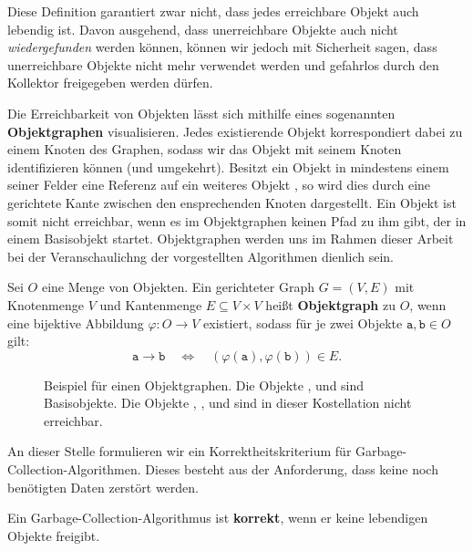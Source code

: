 Diese Definition garantiert zwar nicht, dass jedes erreichbare Objekt auch lebendig ist.
Davon ausgehend, dass unerreichbare Objekte auch nicht \textit{wiedergefunden} werden können, können wir jedoch mit Sicherheit sagen, dass unerreichbare Objekte nicht mehr verwendet werden und gefahrlos durch den Kollektor freigegeben werden dürfen.

Die Erreichbarkeit von Objekten lässt sich mithilfe eines sogenannten \textbf{Objektgraphen} visualisieren.
Jedes existierende Objekt korrespondiert dabei zu einem Knoten des Graphen, sodass wir das Objekt mit seinem Knoten identifizieren können (und umgekehrt).
Besitzt ein Objekt  in mindestens einem seiner Felder eine Referenz auf ein weiteres Objekt , so wird dies durch eine gerichtete Kante zwischen den ensprechenden Knoten dargestellt.
Ein Objekt ist somit nicht erreichbar, wenn es im Objektgraphen keinen Pfad zu ihm gibt, der in einem Basisobjekt startet.
Objektgraphen werden uns im Rahmen dieser Arbeit bei der Veranschaulichng der vorgestellten Algorithmen dienlich sein.

	
\begin{mybox}
\begin{defn}[Objektgraph]
	Sei $O$ eine Menge von Objekten.
	Ein gerichteter Graph $G = (V,E)$ mit Knotenmenge $V$ und Kantenmenge $E \subseteq V \times V$ heißt \textbf{Objektgraph} zu $O$, wenn eine bijektive Abbildung $\varphi \colon O \rightarrow V$ existiert, sodass für je zwei Objekte $\mathtt{a,b} \in O$ gilt:
	\[
		\mathtt{a} \rightarrow \mathtt{b} \quad \Leftrightarrow \quad (\varphi(\mathtt{a}),\varphi(\mathtt{b})) \in E.
	\]
\end{defn}
\end{mybox}

\begin{figure}[h]
	\centering
	
	\caption[Beispiel für einen Objektgraphen]{Beispiel für einen Objektgraphen. Die Objekte ,  und  sind Basisobjekte. Die Objekte , ,  und  sind in dieser Kostellation nicht erreichbar.}
\end{figure}

An dieser Stelle formulieren wir ein Korrektheitskriterium für Garbage-Collection-Algorithmen.
Dieses besteht aus der Anforderung, dass keine noch benötigten Daten zerstört werden.

\begin{mybox}
\begin{defn}
	Ein Garbage-Collection-Algorithmus ist \textbf{korrekt}, wenn er keine lebendigen Objekte freigibt.
\end{defn}
\end{mybox}

